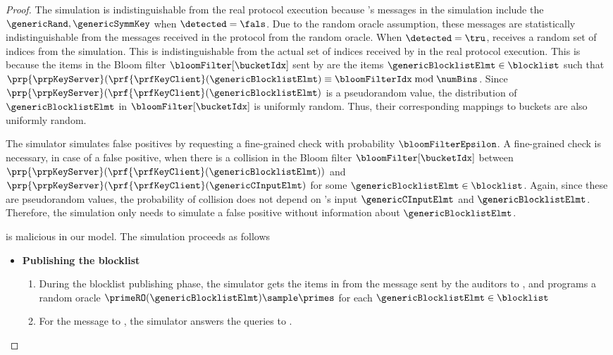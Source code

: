 \begin{proof}
The simulation is indistinguishable from the real protocol execution because \client's messages in the simulation include the $\genericRand,\genericSymmKey$ when $\detected = \fals$. Due to the random oracle assumption, these messages are statistically indistinguishable from the messages received in the protocol from the random oracle. When $\detected = \tru$, \client receives a random set of indices from the simulation. This is indistinguishable from the actual set of indices \bucketIDSet received by \client in the real protocol execution. This is because the items in the Bloom filter $\bloomFilter[\bucketIdx]$ sent by \client are the items $\genericBlocklistElmt \in \blocklist$ such that $\prp{\prpKeyServer}(\prf{\prfKeyClient}(\genericBlocklistElmt) \equiv \bloomFilterIdx \bmod \numBins$. Since $\prp{\prpKeyServer}(\prf{\prfKeyClient}(\genericBlocklistElmt)$ is a pseudorandom value, the distribution of $\genericBlocklistElmt$ in $\bloomFilter[\bucketIdx]$ is uniformly random. Thus, their corresponding mappings to buckets are also uniformly random. 

The simulator simulates false positives by requesting a fine-grained check with probability $\bloomFilterEpsilon$. A fine-grained check is necessary, in case of a false positive, when there is a collision in the Bloom filter $\bloomFilter[\bucketIdx]$ between 
$\prp{\prpKeyServer}(\prf{\prfKeyClient}(\genericBlocklistElmt))$ and $\prp{\prpKeyServer}(\prf{\prfKeyClient}(\genericCInputElmt)$ for some $\genericBlocklistElmt \in \blocklist$.  Again, since these are pseudorandom values, the probability of collision does not depend on \client's input $\genericCInputElmt$ and $\genericBlocklistElmt$. Therefore, the simulation only needs \bloomFilterEpsilon to simulate a false positive without information about $\genericBlocklistElmt$. 



%
\server is malicious in our model. The simulation proceeds as follows 


\begin{itemize} 
\item \textbf{Publishing the blocklist}
\begin{enumerate}
\item During the blocklist publishing phase, the simulator gets the items in \blocklist from the \publishList message sent by the auditors to \authOPRFFunc, and programs a random oracle $\primeRO(\genericBlocklistElmt) \sample \primes$ for each $\genericBlocklistElmt \in \blocklist$ 
\item For the message to \distSigningFunc, the simulator answers the queries to \primeRO. 
\end{enumerate}


\end{itemize}
\end{proof}
